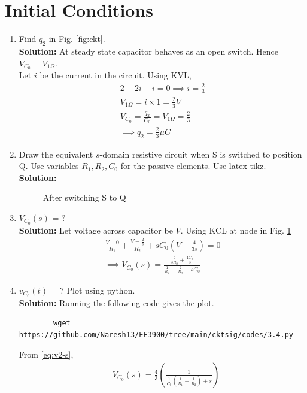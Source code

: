 \documentclass[journal,12pt,twocolumn]{IEEEtran}
\newcommand{\solution}{\noindent \textbf{Solution: }}
\providecommand{\brak}[1]{\ensuremath{\left(#1\right)}}
\numberwithin{equation}{section}
\renewcommand\thesection{\arabic{section}}
\begin{document}
 \section{Initial Conditions}
\begin{enumerate}[label=\arabic*.,ref=\thesection.\theenumi]
\item Find $q_2$ in Fig. \ref{fig:ckt}.\\
			\solution At steady state capacitor behaves as an open switch. Hence $V_{C_0}=V_{1 \Omega}$.\\
			Let $i$ be the current in the circuit. Using KVL,
			\begin{align}
				2-2i-i=0 \implies i=\frac{2}{3}\\
				V_{1 \Omega}=i \times 1= \frac{2}{3} V\\
			V_{C_0}=\frac{q_2}{C_0}=V_{1 \Omega}=\frac{2}{3}\\
			\implies q_2=\frac{2}{3} \mu C
			\end{align}
\item Draw the equivalent $s$-domain resistive circuit when S is switched to position Q.  Use variables $R_1, R_2, C_0$ for the passive elements.
Use latex-tikz.
		\label{prob:init}
		\\\solution 
	\begin{figure}[!ht]
 \centering

\caption{After switching S to Q}
\label{fig:sq}
\end{figure}
		\item $V_{C_0}(s)$ = ? \\
		\solution Let voltage across capacitor be $V$. Using KCL at node in Fig. \ref{fig:sq}
\begin{align}
    \frac{V - 0}{R_1} + \frac{V - \frac{2}{s}}{R_2} + sC_0\brak{V - \frac{4}{3s}} = 0 \\
\implies V_{C_0}(s) = \frac{\frac{2}{sR_2} + \frac{4C_0}{3}}{\frac{1}{R_1} + \frac{2}{R_2} + sC_0}
\label{eq:v2-s}
\end{align} 
	\item $v_{C_0}(t)$ = ? Plot using python.\\
	\solution Running the following code gives the plot.
	\begin{lstlisting}
		wget https://github.com/Naresh13/EE3900/tree/main/cktsig/codes/3.4.py
	\end{lstlisting}
	From \eqref{eq:v2-s},
\begin{align}
    &V_{C_0}(s) = \frac{4}{3}\brak{\frac{1}{\frac{1}{C_0}\brak{\frac{1}{R_1} + \frac{1}{R_2}}+s}} \nonumber \\

\end{align}
\end{enumerate}
\end{document}
